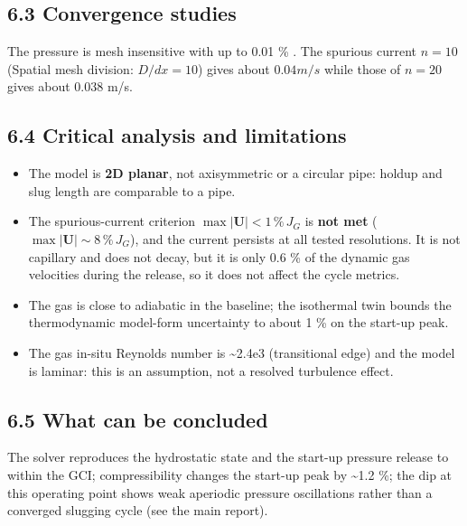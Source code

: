 \documentclass[11pt,english]{article}
\providecommand{\tightlist}{%
  \setlength{\itemsep}{0pt}\setlength{\parskip}{0pt}}
\begin{document}
\subsection{6.3 Convergence studies}\label{convergence-studies}

The pressure is mesh insensitive with up to 0.01 \% . The spurious current $n=10$ (Spatial mesh division: $D/dx=10$) gives about $0.04 m/s$ while those of $n=20$ gives about 0.038 m/s. 

\subsection{6.4 Critical analysis and limitations}\label{critical-analysis-and-limitations}

\begin{itemize}
\tightlist
\item
  The model is \textbf{2D planar}, not axisymmetric or a circular pipe:
  holdup and slug length are comparable to a pipe.
\item
  The spurious-current criterion
  \(\max|\mathbf U| < 1\,\%\,J_G\) is \textbf{not met}
  (\(\max|\mathbf U| \sim 8\,\%\,J_G\)), and the current persists at all
  tested resolutions. It is not capillary and does not decay, but it is
  only 0.6 \% of the dynamic gas velocities during the release, so it
  does not affect the cycle metrics.
\item
  The gas is close to adiabatic in the baseline; the isothermal twin
  bounds the thermodynamic model-form uncertainty to about 1 \% on the
  start-up peak.
\item
  The gas in-situ Reynolds number is \textasciitilde2.4e3 (transitional
  edge) and the model is laminar: this is an assumption, not a resolved
  turbulence effect.
\end{itemize}

\subsection{6.5 What can be concluded}\label{what-can-be-concluded}

The solver reproduces the hydrostatic state and the
start-up pressure release to within the GCI; compressibility changes the
start-up peak by \textasciitilde1.2 \%; the dip at this operating point
shows weak aperiodic pressure oscillations rather than a converged
slugging cycle (see the main report).
\end{document}
